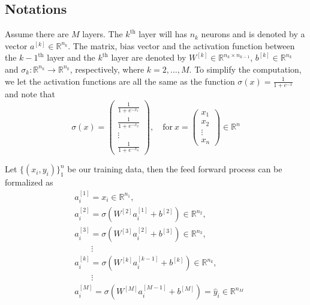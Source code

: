 \documentclass[../main.tex]{subfiles}
\begin{document}
        \subsection{Notations}
            Assume there are $M$ layers.
            The $k^\mathrm{th}$ layer will has $n_k$ neurons and is denoted by a vector $a^{ [k] }\in \mathbb{R}^{n_k}$.
            The matrix, bias vector and the activation function between the $k-1^{\mathrm{th}}$ layer and the $k^\mathrm{th}$ layer are denoted by $W^{ [k] }\in \mathbb{R}^{ n_k\times n_{k-1} }$, $b^{[k]} \in \mathbb{R}^{n_k}$ and $\sigma_k: \mathbb{R}^{n_k} \rightarrow \mathbb{R}^{n_k}$, respectively, where $k=2,\dots,M$.
            To simplify the computation, we let the activation functions are all the same as the function $\sigma(x) = \frac{1}{1+e^{-x}}$ and note that
            \[
                \sigma(x) = \left( 
                    \begin{array}{c}
                        \frac{1}{1+e^{-x_1}} \\
                        \frac{1}{1+e^{-x_2}} \\
                        \vdots \\
                        \frac{1}{1+e^{-x_n}}                         
                    \end{array}
                \right),\quad\mathrm{for~}x=\left(
                    \begin{array}{c}
                        x_1 \\
                        x_2 \\
                        \vdots \\
                        x_n
                    \end{array}
                \right) \in \mathbb{R}^n
            \]
            
            Let $\{(x_i, y_i)\}_1^n$ be our training data, then the feed forward process can be formalized as 
            \begin{align*}
                & a_i^{ [1] } = x_i \in \mathbb{R}^{n_1}, \\
                & a_i^{ [2] } = \sigma (W^{ [2] }a_i^{ [1] } + b^{ [2] }) \in \mathbb{R}^{n_2}, \\
                & a_i^{ [3] } = \sigma (W^{ [3] }a_i^{ [2] } + b^{ [3] }) \in \mathbb{R}^{n_3}, \\
                & \qquad\vdots\\
                & a_i^{ [k] } = \sigma (W^{ [k] } a_i^{ [k-1] } + b^{ [k] }) \in \mathbb{R}^{n_k}, \\
                & \qquad\vdots\\
                & a_i^{ [M] } = \sigma (W^{ [M] } a_i^{ [M-1] } + b^{ [M] })=\hat{y}_i \in \mathbb{R}^{n_M}
            \end{align*}
            
\end{document}
